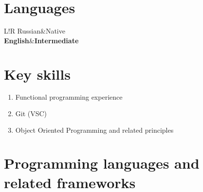 \documentclass[]{report}
\newcommand\VRule{\color{lightgray}\vrule width 0.5pt}
\begin{document}
\section*{\Large Languages}
\begin{tabular}{L!{\VRule}R}
Russian&Native\\
{\bf English}&{\bf Intermediate}
\end{tabular}


\section*{Key skills}

\begin{enumerate}

\item {{\large Functional programming experience}}
\item {{\large Git (VSC)}}
\item {{\large Object Oriented Programming and related principles}}

\end{enumerate}

\section*{Programming languages and related frameworks}
\end{document}
